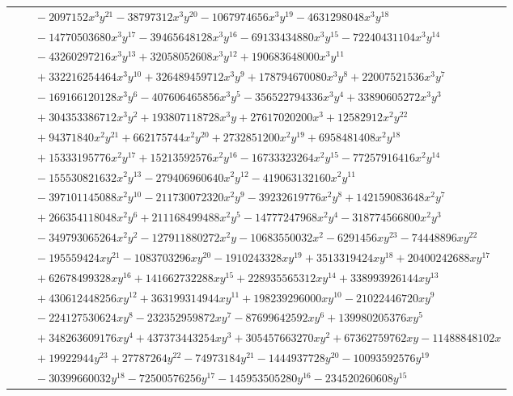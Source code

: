 \documentclass[11pt]{article}
\begin{document}
\begin{longtable}{@{}ll@{}}
 & $\quad -2097152x^{3}y^{21}-38797312x^{3}y^{20}-1067974656x^{3}y^{19}-4631298048x^{3}y^{18}$\\
 & $\quad -14770503680x^{3}y^{17}-39465648128x^{3}y^{16}-69133434880x^{3}y^{15}-72240431104x^{3}y^{14}$\\
 & $\quad -43260297216x^{3}y^{13}+32058052608x^{3}y^{12}+190683648000x^{3}y^{11}$\\
 & $\quad +332216254464x^{3}y^{10}+326489459712x^{3}y^{9}+178794670080x^{3}y^{8}+22007521536x^{3}y^{7}$\\
 & $\quad -169166120128x^{3}y^{6}-407606465856x^{3}y^{5}-356522794336x^{3}y^{4}+33890605272x^{3}y^{3}$\\
 & $\quad +304353386712x^{3}y^{2}+193807118728x^{3}y+27617020200x^{3}+12582912x^{2}y^{22}$\\
 & $\quad +94371840x^{2}y^{21}+662175744x^{2}y^{20}+2732851200x^{2}y^{19}+6958481408x^{2}y^{18}$\\
 & $\quad +15333195776x^{2}y^{17}+15213592576x^{2}y^{16}-16733323264x^{2}y^{15}-77257916416x^{2}y^{14}$\\
 & $\quad -155530821632x^{2}y^{13}-279406960640x^{2}y^{12}-419063132160x^{2}y^{11}$\\
 & $\quad -397101145088x^{2}y^{10}-211730072320x^{2}y^{9}-39232619776x^{2}y^{8}+142159083648x^{2}y^{7}$\\
 & $\quad +266354118048x^{2}y^{6}+211168499488x^{2}y^{5}-14777247968x^{2}y^{4}-318774566800x^{2}y^{3}$\\
 & $\quad -349793065264x^{2}y^{2}-127911880272x^{2}y-10683550032x^{2}-6291456xy^{23}-74448896xy^{22}$\\
 & $\quad -195559424xy^{21}-1083703296xy^{20}-1910243328xy^{19}+3513319424xy^{18}+20400242688xy^{17}$\\
 & $\quad +62678499328xy^{16}+141662732288xy^{15}+228935565312xy^{14}+338993926144xy^{13}$\\
 & $\quad +430612448256xy^{12}+363199314944xy^{11}+198239296000xy^{10}-21022446720xy^{9}$\\
 & $\quad -224127530624xy^{8}-232352959872xy^{7}-87699642592xy^{6}+139980205376xy^{5}$\\
 & $\quad +348263609176xy^{4}+437373443254xy^{3}+305457663270xy^{2}+67362759762xy-11488848102x$\\
 & $\quad +19922944y^{23}+27787264y^{22}-74973184y^{21}-1444937728y^{20}-10093592576y^{19}$\\
 & $\quad -30399660032y^{18}-72500576256y^{17}-145953505280y^{16}-234520260608y^{15}$\\

\end{longtable}
\end{document}
